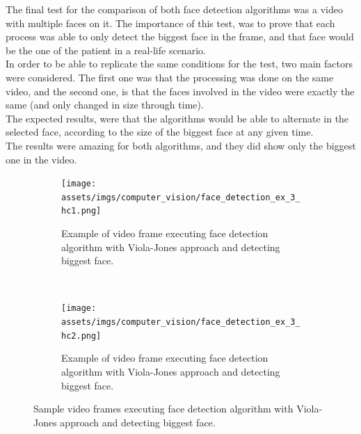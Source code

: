 \documentclass[11pt]{report} %
\begin{document}
The final test for the comparison of both face detection algorithms was a video with multiple faces on it. The importance of this test, was to prove that each process was able to only detect the biggest face in the frame, and that face would be the one of the patient in a real-life scenario.\\

In order to be able to replicate the same conditions for the test, two main factors were considered. The first one was that the processing was done on the same video, and the second one, is that the faces involved in the video were exactly the same (and only changed in size through time).\\

The expected results, were that the algorithms would be able to alternate in the selected face, according to the size of the biggest face at any given time.\\

The results were amazing for both algorithms, and they did show only the biggest one in the video.\\

\begin{figure}[H]
	\centering
	\begin{subfigure}{.5\textwidth}
		\centering
		\texttt{[image: assets/imgs/computer\_vision/face\_detection\_ex\_3\_hc1.png]}
		\caption{Example of video frame executing face detection algorithm with Viola-Jones approach and detecting biggest face.}
		\label{fig_face_detect_biggest_face_hc_1_a}
	\end{subfigure}~
	\begin{subfigure}{.5\textwidth}
		\centering
		\texttt{[image: assets/imgs/computer\_vision/face\_detection\_ex\_3\_hc2.png]}
		\caption{Example of video frame executing face detection algorithm with Viola-Jones approach and detecting biggest face.}
		\label{fig_face_detect_biggest_face_hc_1_b}
	\end{subfigure}%
	\caption{Sample video frames executing face detection algorithm with Viola-Jones approach and detecting biggest face.}
	\label{fig_face_detect_biggest_face_hc_1}
\end{figure}
\end{document}
